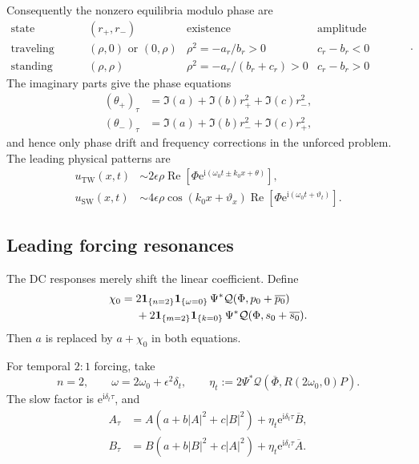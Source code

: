 \documentclass[11pt]{article}
\newcommand{\ii}{\mathrm{i}}
\newcommand{\ee}{\mathrm{e}}
\newcommand{\cQ}{\mathcal{Q}}
\newcommand{\one}[1]{\bm{1}_{\{#1\}}}
\DeclareMathOperator{\RePart}{Re}
\begin{document}
Consequently the nonzero equilibria modulo phase are
\begin{equation}
\begin{array}{c|c|c|c}
 \text{state}&(r_+,r_-)&\text{existence}&\text{amplitude stability}\\ \hline
 \text{traveling wave}&(\rho,0)\text{ or }(0,\rho)
 &\rho^2=-a_r/b_r>0&c_r-b_r<0\\
 \text{standing wave}&(\rho,\rho)
 &\rho^2=-a_r/(b_r+c_r)>0&c_r-b_r>0
\end{array}.
 \label{eq:state-table}
\end{equation}
The imaginary parts give the phase equations
\begin{align}
 (\theta_+)_\tau&=\Im(a)+\Im(b)r_+^2+\Im(c)r_-^2,\\
 (\theta_-)_\tau&=\Im(a)+\Im(b)r_-^2+\Im(c)r_+^2,
\end{align}
and hence only phase drift and frequency corrections in the unforced
problem.  The leading physical patterns are
\begin{align}
 u_{\mathrm{TW}}(x,t)
 &\sim2\epsilon\rho\RePart\left[
 \Phi\ee^{\ii(\omega_0t\pm k_0x+\theta)}\right],
 \label{eq:TW-pattern}\\
 u_{\mathrm{SW}}(x,t)
 &\sim4\epsilon\rho\cos(k_0x+\vartheta_x)
 \RePart\left[
 \Phi\ee^{\ii(\omega_0t+\vartheta_t)}\right].
 \label{eq:SW-pattern}
\end{align}

\subsection{Leading forcing resonances}

The DC responses merely shift the linear coefficient.  Define
\begin{align}
 \chi_0={}&2\one{n=2}\one{\omega=0}\,
 \Psi^*\cQ(\Phi,p_0+\overline{p_0})
 \notag\\
 &+2\one{m=2}\one{k=0}\,
 \Psi^*\cQ(\Phi,s_0+\overline{s_0}).
 \label{eq:DC-shift}
\end{align}
Then $a$ is replaced by $a+\chi_0$ in both equations.

For temporal $2{:}1$ forcing, take
\begin{equation}
 n=2,
 \qquad \omega=2\omega_0+\epsilon^2\delta_t,
 \qquad
 \eta_t:=2\Psi^*\cQ\left(
 \overline\Phi,R(2\omega_0,0)P\right).
 \label{eq:temporal-coefficient}
\end{equation}
The slow factor is $\ee^{\ii\delta_t\tau}$, and
\begin{subequations}
\label{eq:temporal-amplitude}
\begin{align}
 A_\tau&=A(a+b|A|^2+c|B|^2)
 +\eta_t\ee^{\ii\delta_t\tau}\overline B,\\
 B_\tau&=B(a+b|B|^2+c|A|^2)
 +\eta_t\ee^{\ii\delta_t\tau}\overline A.
\end{align}
\end{subequations}
\end{document}
